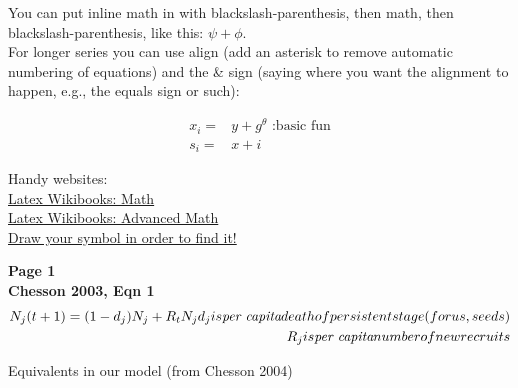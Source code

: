 \documentclass[11pt,a4paper,oneside]{article}
\begin{document}
You can put inline math in with blackslash-parenthesis, then math, then blackslash-parenthesis, like this: \(\psi+\phi\).\\

For longer series you can use align (add an asterisk to remove automatic numbering of equations) and the \& sign (saying where you want the alignment to happen, e.g., the equals sign or such):

\begin{align}
x_{i} =& y+g^{\theta} \text{   :basic fun} 
\\
s_{i} =& x+i
\end{align}

\noindent Handy websites:\\
\href {http://en.wikibooks.org/wiki/LaTeX/Mathematics}{Latex Wikibooks: Math}\\
\href{http://en.wikibooks.org/wiki/LaTeX/Advanced_Mathematics}{Latex Wikibooks: Advanced Math}\\
\href{http://detexify.kirelabs.org/classify.html}{Draw your symbol in order to find it!}

\noindent \bf{Page 1}\\
\noindent Chesson 2003, Eqn 1
\begin{align}
N_{j}(t+1) = (1-d_{j}) N_{j} + R_{t}N_{j}
d_{j} is \emph{per capita} death of persistent stage (for us, seeds)\\
R_{j} is \emph{per capita} number of new recruits

\end{align} 


Equivalents in our model (from Chesson 2004)
\end{document}
